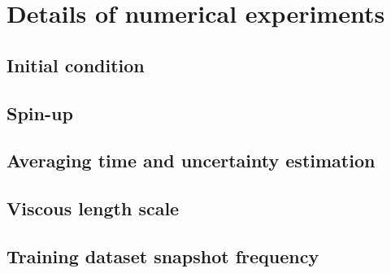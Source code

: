 \documentclass[../main.tex]{subfiles}
\begin{document}
\ifSubfilesClassLoaded{
    \frontmatter
    \tableofcontents
    \mainmatter
}{}

\appendix
\chapter{Details of numerical experiments} \label{chap:details}
\setlength{\epigraphwidth}{.45\textwidth}


\section{Initial condition} \label{sec:initial_condition}


\section{Spin-up} \label{sec:spinup}


\section{Averaging time and uncertainty estimation} \label{sec:averaging_time}


\section{Viscous length scale} \label{sec:viscous_length}


\section{Training dataset snapshot frequency} \label{sec:snapshot_freq}



\ifSubfilesClassLoaded{%
    \emergencystretch=5em
    \printbibliography{}
}{}
\end{document}
